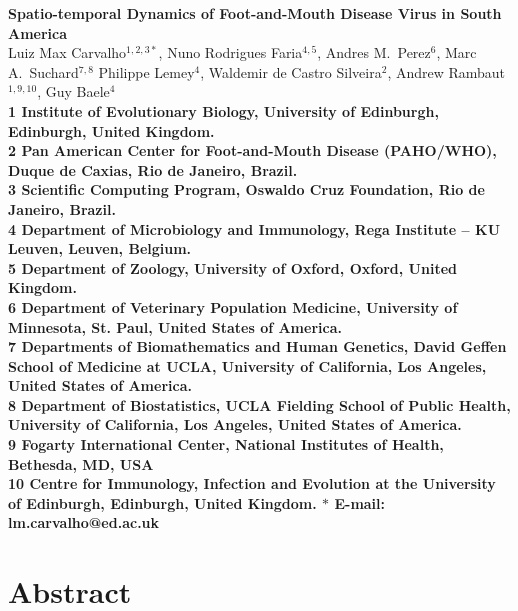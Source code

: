 \documentclass[10pt]{article}
\date{}
\begin{document}
\begin{flushleft}
{\Large
\textbf{Spatio-temporal Dynamics of Foot-and-Mouth Disease Virus in South America}
}
\\
Luiz Max Carvalho$^{1,2,3\ast}$,
Nuno Rodrigues Faria$^{4,5}$,
Andres M.~Perez$^{6}$,
Marc A.~Suchard$^{7,8}$
Philippe Lemey$^{4}$,
Waldemir de Castro Silveira$^{2}$,
Andrew Rambaut$^{1,9,10}$,
Guy Baele$^{4}$
\\
\bf{1} Institute of Evolutionary Biology, University of Edinburgh, Edinburgh, United Kingdom.\\
\bf{2} Pan American Center for Foot-and-Mouth Disease (PAHO/WHO), Duque de Caxias, Rio de Janeiro, Brazil.\\
\bf{3} Scientific Computing Program, Oswaldo Cruz Foundation, Rio de Janeiro, Brazil.\\
\bf{4} Department of Microbiology and Immunology, Rega Institute -- KU Leuven, Leuven, Belgium.\\
\bf{5} Department of Zoology, University of Oxford, Oxford, United Kingdom.\\
\bf{6} Department of Veterinary Population Medicine, University of Minnesota, St. Paul, United States of America.\\
\bf{7} Departments of Biomathematics and Human Genetics, David Geffen School of Medicine at UCLA, University of California, Los Angeles,  United States of America.\\
\bf{8} Department of Biostatistics, UCLA Fielding School of Public Health, University of California, Los Angeles,  United States of America.\\
\bf{9}  Fogarty International Center, National Institutes of Health, Bethesda, MD, USA\\
\bf{10} Centre for Immunology, Infection and Evolution at the University of Edinburgh, Edinburgh, United Kingdom.
$\ast$ E-mail: lm.carvalho@ed.ac.uk
\end{flushleft}
\section*{Abstract}
\end{document}
